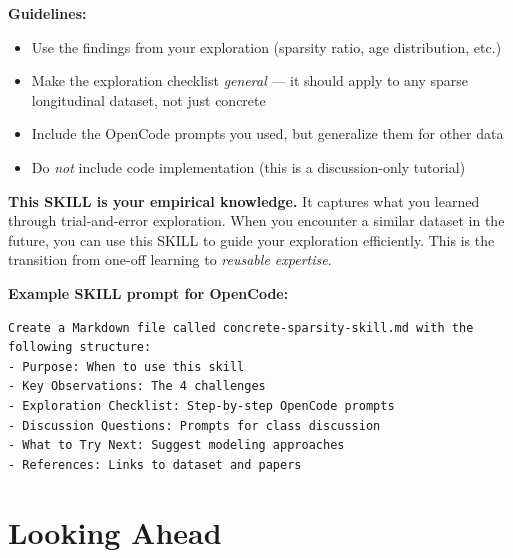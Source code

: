 \documentclass[11pt]{article}
\begin{document}
\textbf{Guidelines:}
\begin{itemize}[nosep]
  \item Use the findings from your exploration (sparsity ratio, age distribution, etc.)
  \item Make the exploration checklist \emph{general} --- it should apply to any sparse longitudinal dataset, not just concrete
  \item Include the OpenCode prompts you used, but generalize them for other data
  \item Do \emph{not} include code implementation (this is a discussion-only tutorial)
\end{itemize}

\begin{alert-box}
\textbf{This SKILL is your empirical knowledge.}  It captures what you learned through trial-and-error exploration.  When you encounter a similar dataset in the future, you can use this SKILL to guide your exploration efficiently.  This is the transition from one-off learning to \emph{reusable expertise}.
\end{alert-box}

\begin{ex-box}
\textbf{Example SKILL prompt for OpenCode:}
\begin{lstlisting}[style=term]
Create a Markdown file called concrete-sparsity-skill.md with the following structure:
- Purpose: When to use this skill
- Key Observations: The 4 challenges
- Exploration Checklist: Step-by-step OpenCode prompts
- Discussion Questions: Prompts for class discussion
- What to Try Next: Suggest modeling approaches
- References: Links to dataset and papers
\end{lstlisting}
\end{ex-box}

\section{Looking Ahead}
\label{sec:outlook}
\end{document}
